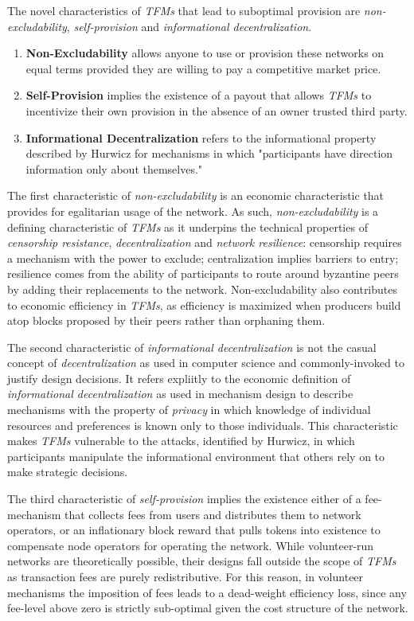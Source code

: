 
The novel characteristics of \textit{TFMs} that lead to suboptimal provision are \emph{non-excludability}, \emph{self-provision} and \emph{informational decentralization}. 

\begin{enumerate}[leftmargin=*,itemsep=0.2em]
\item \textbf{Non-Excludability} allows anyone to use or provision these networks on equal terms provided they are willing to pay a competitive market price.
\item \textbf{Self-Provision} implies the existence of a payout that allows \textit{TFMs} to incentivize their own provision in the absence of an owner trusted third party.
\item \textbf{Informational Decentralization} refers to the informational property described by Hurwicz for mechanisms in which "participants have direction information only about themselves."
\end{enumerate}

The first characteristic of \textit{non-excludability} is an economic characteristic that provides for egalitarian usage of the network. As such, \textit{non-excludability} is a defining characteristic of \textit{TFMs} as it underpins the technical properties of \textit{censorship resistance}, \textit{decentralization} and \textit{network resilience}: censorship requires a mechanism with the power to exclude; centralization implies barriers to entry; resilience comes from the ability of participants to route around byzantine peers by adding their replacements to the network. Non-excludability also contributes to economic efficiency in \textit{TFMs}, as efficiency is maximized when producers build atop blocks proposed by their peers rather than orphaning them.

The second characteristic of \textit{informational decentralization} is not the casual concept of \textit{decentralization} as used in computer science and commonly-invoked to justify design decisions. It refers expliitly to the economic definition of \textit{informational decentralization} as used in mechanism design to describe mechanisms with the property of \textit{privacy} in which knowledge of individual resources and preferences is known only to those individuals. This characteristic makes \textit{TFMs} vulnerable to the attacks, identified by Hurwicz, in which participants manipulate the informational environment that others rely on to make strategic decisions.

The third characteristic of \textit{self-provision} implies the existence either of a fee-mechanism that collects fees from users and distributes them to network operators, or an inflationary block reward that pulls tokens into existence to compensate node operators for operating the network. While volunteer-run networks are theoretically possible, their designs fall outside the scope of \textit{TFMs} as transaction fees are purely redistributive. For this reason, in volunteer mechanisms the imposition of fees leads to a dead-weight efficiency loss, since any fee-level above zero is strictly sub-optimal given the cost structure of the network.


